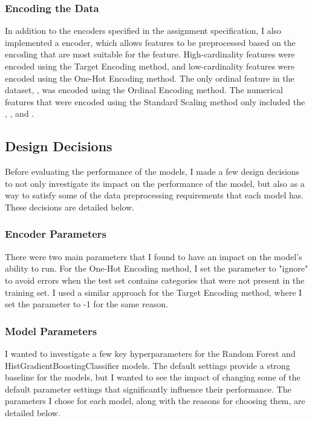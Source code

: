 \documentclass{article}
\begin{document}
\subsubsection{Encoding the Data}
In addition to the encoders specified in the assignment specification, I also implemented a  encoder, which allows features to be preprocessed based on the encoding that are most suitable for the feature. High-cardinality features were encoded using the Target Encoding method, and low-cardinality features were encoded using the One-Hot Encoding method. The only ordinal feature in the dataset, , was encoded using the Ordinal Encoding method. The numerical features that were encoded using the Standard Scaling method only included the , ,  and .

\subsection{Design Decisions}
Before evaluating the performance of the models, I made a few design decisions to not only investigate its impact on the performance of the model, but also as a way to satisfy some of the data preprocessing requirements that each model has. These decisions are detailed below.

\subsubsection{Encoder Parameters}

There were two main parameters that I found to have an impact on the model's ability to run. For the One-Hot Encoding method, I set the  parameter to "ignore" to avoid errors when the test set contains categories that were not present in the training set. I used a similar approach for the Target Encoding method, where I set the  parameter to -1 for the same reason. 

\subsubsection{Model Parameters}
I wanted to investigate a few key hyperparameters for the Random Forest and HistGradientBoostingClassifier models. The default settings provide a strong baseline for the models, but I wanted to see the impact of changing some of the default parameter settings that significantly influence their performance. The parameters I chose for each model, along with the reasons for choosing them, are detailed below.
\end{document}
